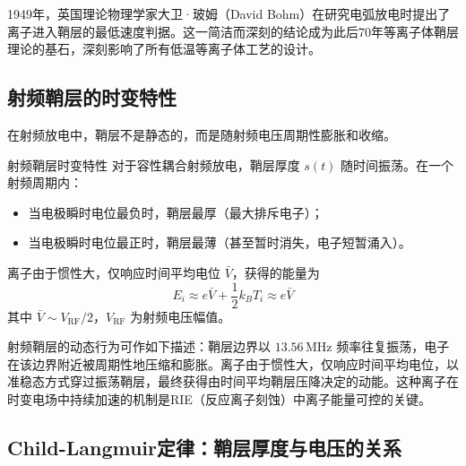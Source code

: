 \documentclass[12pt,a4paper,openany,oneside]{book}
\begin{document}
\begin{history}{}{}
1949年，英国理论物理学家大卫·玻姆（David Bohm）在研究电弧放电时提出了离子进入鞘层的最低速度判据。这一简洁而深刻的结论成为此后70年等离子体鞘层理论的基石，深刻影响了所有低温等离子体工艺的设计。
\end{history}

\subsection{射频鞘层的时变特性}

在射频放电中，鞘层不是静态的，而是随射频电压周期性膨胀和收缩。

\begin{theorem}{射频鞘层时变特性}{}{}
\label{thm:rf-sheath}
对于容性耦合射频放电，鞘层厚度 $s(t)$ 随时间振荡。在一个射频周期内：
\begin{itemize}
\item 当电极瞬时电位最负时，鞘层最厚（最大排斥电子）；
\item 当电极瞬时电位最正时，鞘层最薄（甚至暂时消失，电子短暂涌入）。
\end{itemize}
离子由于惯性大，仅响应时间平均电位 $\bar{V}$，获得的能量为
\begin{equation}
\label{eq:ion-energy-rf}
E_i \approx e\bar{V} + \frac{1}{2}k_B T_i \approx e\bar{V}
\end{equation}
其中 $\bar{V} \sim V_{\text{RF}}/2$，$V_{\text{RF}}$ 为射频电压幅值。
\end{theorem}

\begin{insight}{}{}
射频鞘层的动态行为可作如下描述：鞘层边界以 $13.56\,\mathrm{MHz}$ 频率往复振荡，电子在该边界附近被周期性地压缩和膨胀。离子由于惯性大，仅响应时间平均电位，以准稳态方式穿过振荡鞘层，最终获得由时间平均鞘层压降决定的动能。这种离子在时变电场中持续加速的机制是RIE（反应离子刻蚀）中离子能量可控的关键。
\end{insight}

\subsection{Child-Langmuir定律：鞘层厚度与电压的关系}
\end{document}
